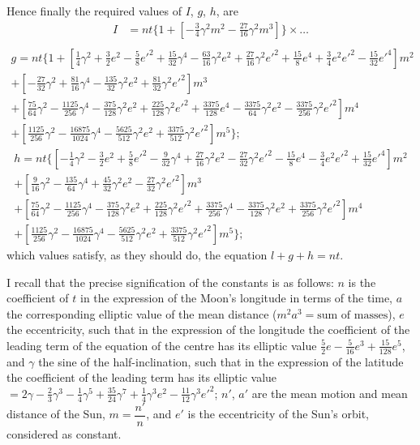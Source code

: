 \documentclass[11pt,a4paper]{article}
\theoremstyle{plain}
\theoremstyle{definition}
\theoremstyle{remark}
\begin{document}
Hence finally the required values of $I$, $g$, $h$, are
\begin{align*}
I &= nt\{1 + [-\tfrac34 \gamma^{2}m^{2} - \tfrac{27}{16}\gamma^{2}m^{3}]\} \times \dots \\
\end{align*}
\begin{multline*}
g = nt\{1 + [\tfrac14 \gamma^{2} + \tfrac32 e^{2} - \tfrac{5}{8}e'^{2} + \tfrac{15}{32}\gamma^{4} - \tfrac{63}{16}\gamma^{2}e^{2} + \tfrac{27}{16}\gamma^{2}e'^{2} + \tfrac{15}{8}e^{4} + \tfrac{3}{4}e^{2}e'^{2} - \tfrac{15}{32}e'^{4}]m^{2}\\
+ [-\tfrac{27}{32}\gamma^{2} + \tfrac{81}{16}\gamma^{4} - \tfrac{135}{32}\gamma^{2}e^{2} + \tfrac{81}{32}\gamma^{2}e'^{2}]m^{3}\\
+ [\tfrac{75}{64}\gamma^{2} - \tfrac{1125}{256}\gamma^{4} - \tfrac{375}{128}\gamma^{2}e^{2} + \tfrac{225}{128}\gamma^{2}e'^{2} + \tfrac{3375}{128}e^{4} - \tfrac{3375}{64}\gamma^{2}e^{2} - \tfrac{3375}{256}\gamma^{2}e'^{2}]m^{4}\\
+ [\tfrac{1125}{256}\gamma^{2} - \tfrac{16875}{1024}\gamma^{4} - \tfrac{5625}{512}\gamma^{2}e^{2} + \tfrac{3375}{512}\gamma^{2}e'^{2}]m^{5}\};
\end{multline*}
\begin{multline*}
h = nt\{[-\tfrac14 \gamma^{2} - \tfrac32 e^{2} + \tfrac{5}{8}e'^{2} - \tfrac{9}{32}\gamma^{4} + \tfrac{27}{16}\gamma^{2}e^{2} - \tfrac{27}{32}\gamma^{2}e'^{2} - \tfrac{15}{8}e^{4} - \tfrac{3}{4}e^{2}e'^{2} + \tfrac{15}{32}e'^{4}]m^{2}\\
+ [\tfrac{9}{16}\gamma^{2} - \tfrac{135}{64}\gamma^{4} + \tfrac{45}{32}\gamma^{2}e^{2} - \tfrac{27}{32}\gamma^{2}e'^{2}]m^{3}\\
+ [\tfrac{75}{64}\gamma^{2} - \tfrac{1125}{256}\gamma^{4} - \tfrac{375}{128}\gamma^{2}e^{2} + \tfrac{225}{128}\gamma^{2}e'^{2} + \tfrac{3375}{256}\gamma^{4} - \tfrac{3375}{128}\gamma^{2}e^{2} + \tfrac{3375}{256}\gamma^{2}e'^{2}]m^{4}\\
+ [\tfrac{1125}{256}\gamma^{2} - \tfrac{16875}{1024}\gamma^{4} - \tfrac{5625}{512}\gamma^{2}e^{2} + \tfrac{3375}{512}\gamma^{2}e'^{2}]m^{5}\};
\end{multline*}
which values satisfy, as they should do, the equation $l+g+h=nt$.

I recall that the precise signification of the constants is as follows: $n$ is the coefficient of $t$ in the expression of the Moon's longitude in terms of the time, $a$ the corresponding elliptic value of the mean distance ($m^{2}a^{3}=\text{sum of masses}$), $e$ the eccentricity, such that in the expression of the longitude the coefficient of the leading term of the equation of the centre has its elliptic value $\tfrac52 e - \tfrac{5}{16}e^{3} + \tfrac{15}{128}e^{5}$, and $\gamma$ the sine of the half-inclination, such that in the expression of the latitude the coefficient of the leading term has its elliptic value $=2\gamma - \tfrac{2}{3}\gamma^{3} - \tfrac{1}{4}\gamma^{5} + \tfrac{35}{24}\gamma^{7} + \tfrac{1}{4}\gamma^{3}e^{2} - \tfrac{11}{12}\gamma^{3}e'^{2}$; $n'$, $a'$ are the mean motion and mean distance of the Sun, $m=\dfrac{n'}{n}$, and $e'$ is the eccentricity of the Sun's orbit, considered as constant.
\end{document}
